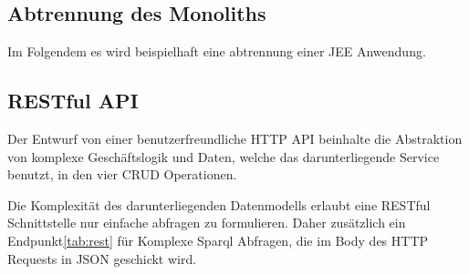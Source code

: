 \documentclass[
12pt,
english,
ngerman,
headsepline,
twoside,
openright,
numbers=noenddot,version=first
]{scrreprt}
\begin{document}
\subsection{Abtrennung des Monoliths}

Im Folgendem es wird beispielhaft eine abtrennung einer JEE Anwendung.














\subsection{RESTful API}
\label{sec:rest}
Der Entwurf von einer benutzerfreundliche \acrfull{HTTP} \acrshort{API} beinhalte die Abstraktion von komplexe Geschäftslogik und Daten, welche das darunterliegende Service benutzt, in den vier \acrlong{CRUD} Operationen.

Die Komplexität des darunterliegenden Datenmodells erlaubt eine RESTful\cite{microAdv} Schnittstelle nur einfache abfragen zu formulieren. Daher zusätzlich ein Endpunkt\ref{tab:rest} für Komplexe Sparql Abfragen, die im Body des HTTP Requests in JSON geschickt wird. 
\end{document}

